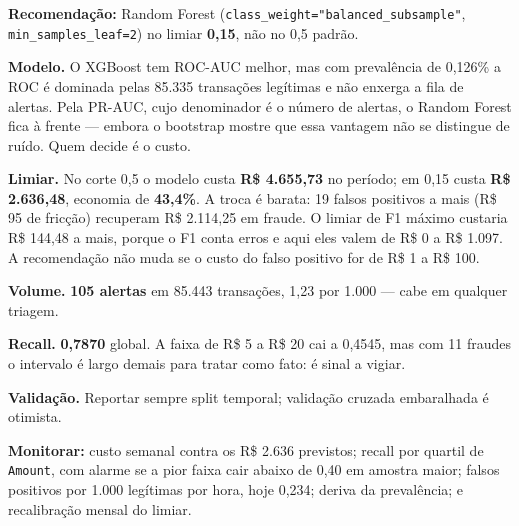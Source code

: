 \documentclass[10pt,a4paper]{article}
\begin{document}
\textbf{Recomendação:} Random Forest (\texttt{class\_weight="balanced\_subsample"},
\texttt{min\_samples\_leaf=2}) no limiar \textbf{0,15}, não no 0,5 padrão.

\textbf{Modelo.} O XGBoost tem ROC-AUC melhor, mas com prevalência de 0,126\% a ROC é dominada
pelas 85.335 transações legítimas e não enxerga a fila de alertas. Pela PR-AUC, cujo
denominador é o número de alertas, o Random Forest fica à frente --- embora o bootstrap mostre
que essa vantagem não se distingue de ruído. Quem decide é o custo.

\textbf{Limiar.} No corte 0,5 o modelo custa \textbf{R\$ 4.655,73} no período; em 0,15 custa
\textbf{R\$ 2.636,48}, economia de \textbf{43,4\%}. A troca é barata: 19 falsos positivos a
mais (R\$ 95 de fricção) recuperam R\$ 2.114,25 em fraude. O limiar de F1 máximo custaria
R\$ 144,48 a mais, porque o F1 conta erros e aqui eles valem de R\$ 0 a R\$ 1.097. A
recomendação não muda se o custo do falso positivo for de R\$ 1 a R\$ 100.

\textbf{Volume.} \textbf{105 alertas} em 85.443 transações, 1,23 por 1.000 --- cabe em qualquer
triagem.

\textbf{Recall.} \textbf{0,7870} global. A faixa de R\$ 5 a R\$ 20 cai a 0,4545, mas com 11
fraudes o intervalo é largo demais para tratar como fato: é sinal a vigiar.

\textbf{Validação.} Reportar sempre split temporal; validação cruzada embaralhada é otimista.

\textbf{Monitorar:} custo semanal contra os R\$ 2.636 previstos; recall por quartil de
\texttt{Amount}, com alarme se a pior faixa cair abaixo de 0,40 em amostra maior; falsos
positivos por 1.000 legítimas por hora, hoje 0,234; deriva da prevalência; e recalibração
mensal do limiar.
\end{document}

